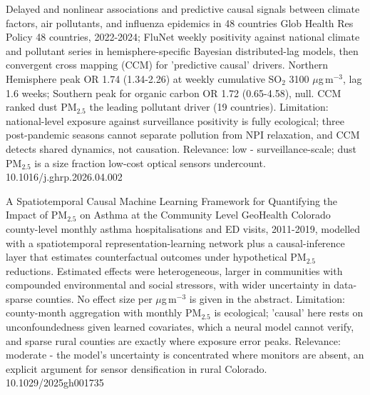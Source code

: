 \documentclass[10pt]{article}
\begin{document}
\par{}\baselineskip{}\baselineskip
{}

{Delayed and nonlinear associations and predictive causal signals between climate factors, air pollutants, and influenza epidemics in 48 countries}
{Glob Health Res Policy}
{48 countries, 2022-2024; FluNet weekly positivity against national climate and pollutant series in hemisphere-specific Bayesian distributed-lag models, then convergent cross mapping (CCM) for 'predictive causal' drivers. Northern Hemisphere peak OR 1.74 (1.34-2.26) at weekly cumulative SO$_2$ 3100 $\mu$g\,m$^{-3}$, lag 1.6 weeks; Southern peak for organic carbon OR 1.72 (0.65-4.58), null. CCM ranked dust PM$_{2.5}$ the leading pollutant driver (19 countries). Limitation: national-level exposure against surveillance positivity is fully ecological; three post-pandemic seasons cannot separate pollution from NPI relaxation, and CCM detects shared dynamics, not causation. Relevance: low - surveillance-scale; dust PM$_{2.5}$ is a size fraction low-cost optical sensors undercount.}
{10.1016/j.ghrp.2026.04.002}

{A Spatiotemporal Causal Machine Learning Framework for Quantifying the Impact of PM$_{2.5}$ on Asthma at the Community Level}
{GeoHealth}
{Colorado county-level monthly asthma hospitalisations and ED visits, 2011-2019, modelled with a spatiotemporal representation-learning network plus a causal-inference layer that estimates counterfactual outcomes under hypothetical PM$_{2.5}$ reductions. Estimated effects were heterogeneous, larger in communities with compounded environmental and social stressors, with wider uncertainty in data-sparse counties. No effect size per $\mu$g\,m$^{-3}$ is given in the abstract. Limitation: county-month aggregation with monthly PM$_{2.5}$ is ecological; 'causal' here rests on unconfoundedness given learned covariates, which a neural model cannot verify, and sparse rural counties are exactly where exposure error peaks. Relevance: moderate - the model's uncertainty is concentrated where monitors are absent, an explicit argument for sensor densification in rural Colorado.}
{10.1029/2025gh001735}

\par{}\baselineskip{}\baselineskip
{}
\end{document}
